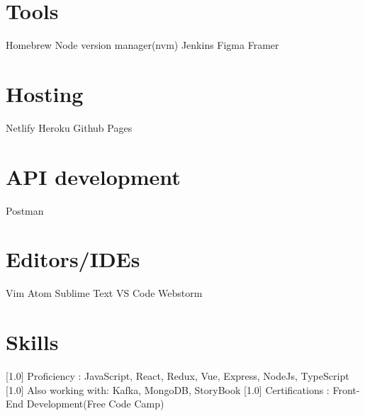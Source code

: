 \documentclass[english]{cv-style}     %
\begin{document}
\begin{aside}
\section{Tools}
\vspace{0.3cm}
Homebrew
Node version manager(nvm)
Jenkins
Figma
Framer

\section{Hosting}
\vspace{0.3cm}
Netlify
Heroku
Github Pages

\section{API development}
\vspace{0.3cm}
Postman

\section{Editors/IDEs}
\vspace{0.3cm}
Vim
Atom
Sublime Text
VS Code
Webstorm



\end{aside}
\vspace{0.2cm}
\section{Skills}
\vspace{-0.2cm}
\begin{entrylist}
\entry
  {\scalebox{.8}[1.0]}
  {Proficiency :}
  {\hspace{0.1cm} \small{JavaScript, React, Redux, Vue, Express, NodeJs, TypeScript}}
  {
 	\textbf{}
 	 \vspace{-0.4cm}
  }
 \entry
  {\scalebox{.8}[1.0]}
  {Also working with: }
  {\hspace{0.1cm} \small{Kafka, MongoDB, StoryBook}}
  {
 	\textbf{}
 	 \vspace{-0.4cm}
  }
 \entry
  {\scalebox{.8}[1.0]}
  {Certifications : }
  {\hspace{0.1cm} \small{Front-End Development(Free Code Camp)}}
  {
 	\textbf{}
 	 \vspace{-0.5cm}
  }
\end{entrylist}
\vspace{-0.1cm}
\end{document}
